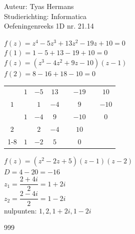 \documentclass[a4paper]{article}
\begin{document}
  
\noindent \large Auteur: Tyas Hermans \\
\noindent \large Studierichting: Informatica\\
\noindent \large Oefeningenreeks 1D nr. 21.14\\

\medskip

\normalsize
$f(z) = z^4 - 5z^3 + 13z^2 - 19z + 10 = 0$\\

$f(1) = 1 - 5 + 13 - 19 + 10 = 0$\\

$f(z) = (z^3 - 4z^2 + 9z - 10)(z-1)$\\

$f(2) = 8 - 16 + 18 - 10 = 0$\\

\begin{tabular}{c|ccccccc}
& $1$ & $-5$ & $13$ & & $-19$ & \vline & $10$ \\
$1$ & & $1$ & $-4$ & & $9$ & \vline & $-10$ \\ \hline
& $1$ & $-4$ & $9$ & \vline & $-10$ & \vline & $0$ \\
$2$ & & $2$ & $-4$ & \vline & $10$ \\ \cline{1-8}
& $1$ & $-2$ & $5$ & \vline & $0$ \\
\end{tabular}

$f(z) = (z^2 - 2z + 5)(z-1)(z-2)$\\

$D = 4 - 20 = -16$\\

$z_1 = \dfrac{2+4i}{2} = 1 + 2i$\\

$z_2 = \dfrac{2-4i}{2} = 1 - 2i$\\

nulpunten: $1,2,1+2i,1-2i$\\

\begin{thebibliography}{999}
\end{thebibliography}
\end{document}
